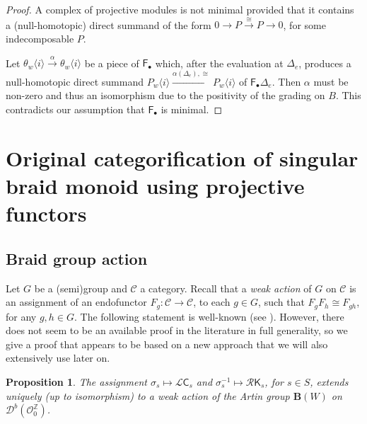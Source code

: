 \documentclass[a4paper]{amsart}
\newtheorem{proposition}[theorem]{Proposition}
\begin{document}
\begin{proof}
A complex of projective modules is not minimal provided that it contains a
(null-homotopic) direct summand of the form $0\to P\overset{\cong}{\longrightarrow} P\to 0$,
for some indecomposable $P$.

Let $\theta_w\langle i\rangle\overset{\alpha}{\longrightarrow} \theta_w\langle i\rangle$
be a piece of $\mathsf{F}_\bullet$ which, after the evaluation at $\Delta_e$, produces
a  null-homotopic direct summand 
$P_w\langle i\rangle  \overset{\alpha(\Delta_e),\cong}{\longrightarrow} P_w\langle i\rangle$
of $\mathsf{F}_\bullet\Delta_e$. 
Then $\alpha$ must be non-zero and thus an isomorphism due to the positivity of 
the grading on $B$. This contradicts our assumption that $\mathsf{F}_\bullet$ is minimal.
\end{proof}


\section{Original categorification of singular braid monoid using 
projective functors}\label{s6}

\subsection{Braid group action}\label{s6.1}

Let $G$ be a (semi)group and $\mathcal{C}$ a category. Recall that a {\em weak action}
of $G$  on $\mathcal{C}$ is an assignment of an endofunctor $F_g:\mathcal{C}\to\mathcal{C}$, 
to each $g\in G$, such that $F_gF_h\cong F_{gh}$, for any $g,h\in G$. The following
statement is well-known (see \cite{MaStr,MaStr2}). However, there does not seem to be an available
proof in the literature in full generality, so we give a proof that appears to be based on a new
approach that we will also extensively use later on.

\begin{proposition}\label{prop6.1.1}
The assignment $\sigma_s\mapsto \mathcal{L}\mathsf{C}_s$ and
$\sigma_s^{-1}\mapsto \mathcal{R}\mathsf{K}_s$, for $s\in S$, extends uniquely
(up to isomorphism) to a weak action of the Artin group $\mathbf{B}(W)$ on 
$\mathcal{D}^b(\mathcal{O}_0^\mathbb{Z})$.
\end{proposition}
\end{document}
